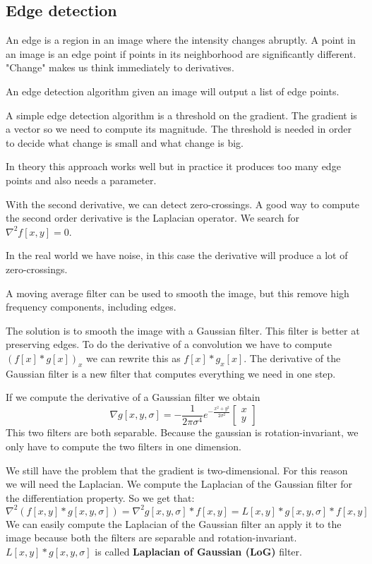 \subsection{Edge detection}
\label{sec:edge_detection}

An edge is a region in an image where the intensity changes abruptly.
A point in an image is an edge point if points in its neighborhood are
significantly different.
"Change" makes us think immediately to derivatives.

An edge detection algorithm given an image will output a list of edge points.

A simple edge detection algorithm is a threshold on the gradient.
The gradient is a vector so we need to compute its magnitude.
The threshold is needed in order to decide what change is small and what change is big.

In theory this approach works well but in practice it produces too many edge points and also
needs a parameter.

With the second derivative, we can detect zero-crossings.
A good way to compute the second order derivative is the Laplacian operator.
We search for $\nabla^2 f[x,y]=0$.

In the real world we have noise, in this case the derivative will produce
a lot of zero-crossings.

A moving average filter can be used to smooth the image, but this remove high frequency
components, including edges.

The solution is to smooth the image with a Gaussian filter.
This filter is better at preserving edges.
To do the derivative of a convolution we have to compute $(f[x]*g[x])_x$
we can rewrite this as $f[x]*g_x[x]$.
The derivative of the Gaussian filter is a new filter that computes everything we need in one step.

If we compute the derivative of a Gaussian filter we obtain
\[
    \nabla g[x,y,\sigma]=-\frac{1}{2\pi\sigma^4}e^{-\frac{x^2+y^2}{2\sigma^2}}\begin{bmatrix}
        x \\
        y
    \end{bmatrix}
\]
This two filters are both separable. Because the gaussian is rotation-invariant, we only have
to compute the two filters in one dimension.

We still have the problem that the gradient is two-dimensional.
For this reason we will need the Laplacian.
We compute the Laplacian of the Gaussian filter for the differentiation property. 
So we get that:
\[
    \nabla^2 (f[x,y]*g[x,y,\sigma]) = \nabla^2g[x,y,\sigma]*f[x,y] =
        L[x,y]*g[x,y,\sigma]*f[x,y]
\]
We can easily compute the Laplacian of the Gaussian filter an apply it to the image
because both the filters are separable and rotation-invariant.
$L[x,y]*g[x,y,\sigma]$ is called \textbf{Laplacian of Gaussian (LoG)} filter.